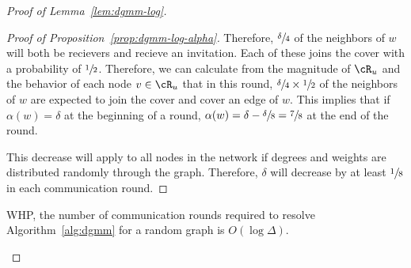 \begin{proof}[Proof of Lemma~\ref{lem:dgmm-log}]
\begin{proof}[Proof of Proposition~\ref{prop:dgmm-log-alpha}]
Therefore, $\sfrac{\delta}{4}$ of the neighbors of $w$ will both be recievers and recieve an invitation. Each of these joins the cover with a probability of $\sfrac{1}{2}$. Therefore, we can calculate from the magnitude of $\cR_u$ and the behavior of each node $v \in \cR_u$ that in this round, $\sfrac{\delta}{4}\times \sfrac{1}{2}$ of the neighbors of $w$ are expected to join the cover and cover an edge of $w$. This implies that if $\alpha(w) = \delta$ at the beginning of a round, $\alpha(w) = \delta-\sfrac{\delta}{8} = \sfrac{7}{8}$ at the end of the round.

This decrease will apply to all nodes in the network if degrees and weights are distributed randomly through the graph. Therefore, $\delta$ will decrease by at least $\sfrac{1}{8}$ in each communication round. 
\end{proof}

\begin{cor}WHP, the number of communication rounds required to resolve Algorithm~\ref{alg:dgmm} for a random graph is $O(\log\Delta)$.\end{cor}

\end{proof} 
